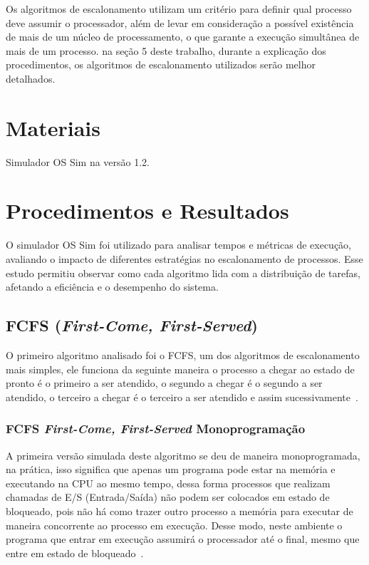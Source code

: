 \documentclass[
	12pt,				%
	oneside,   	        %
	a4paper,			%
	english,			%
	french,				%
	spanish,			%
	brazil,				%
	]{pacotes/abntex2}
\begin{document}
Os algoritmos de escalonamento utilizam um critério para definir qual processo deve assumir o processador, além de levar em consideração a possível existência de mais de um núcleo de processamento, o que garante a execução simultânea de mais de um processo. na seção 5 deste trabalho, durante a explicação dos procedimentos, os algoritmos de escalonamento utilizados serão melhor detalhados.

\section{Materiais}
\label{sec:materiais}

Simulador OS Sim na versão 1.2.

\section{Procedimentos e Resultados}
\label{sec:procedimentos}

O simulador OS Sim foi utilizado para analisar tempos e métricas de execução, avaliando o impacto de diferentes estratégias no escalonamento de processos. Esse estudo permitiu observar como cada algoritmo lida com a distribuição de tarefas, afetando a eficiência e o desempenho do sistema.

\subsection{FCFS (\textit{First-Come, First-Served})}
\label{subsec:fcfs}

O primeiro algoritmo analisado foi o FCFS, um dos algoritmos de escalonamento mais simples, ele funciona da seguinte maneira o processo a chegar ao estado de pronto é o primeiro a ser atendido, o segundo a chegar é o segundo a ser atendido, o terceiro a chegar é o terceiro a ser atendido e assim sucessivamente~\cite{maziero2019}. 

\subsubsection{FCFS \textit{First-Come, First-Served} Monoprogramação}
\label{subsubsec:mono_fcfs}

A primeira versão simulada deste algoritmo se deu de maneira monoprogramada, na prática, isso significa que apenas um programa pode estar na memória e executando na CPU ao mesmo tempo, dessa forma processos que realizam chamadas de E/S (Entrada/Saída) não podem ser colocados em estado de bloqueado, pois não há como trazer outro processo a memória para executar de maneira concorrente ao processo em execução. Desse modo, neste ambiente o programa que entrar em execução assumirá o processador até o final, mesmo que entre em estado de bloqueado~\cite{tanenbaum2016}.
\end{document}
